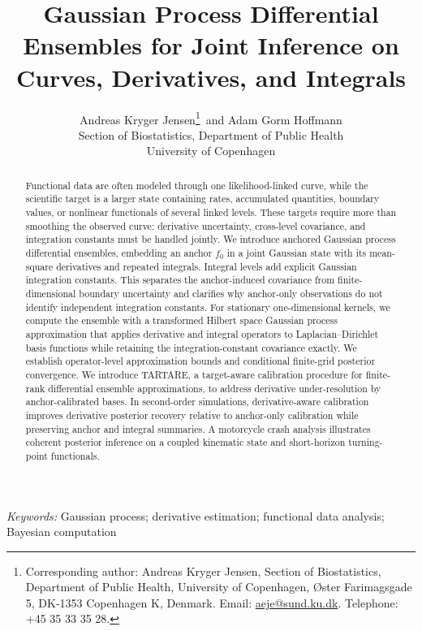\documentclass[11pt,a4paper]{article}
\title{Gaussian Process Differential Ensembles for Joint Inference on Curves, Derivatives, and Integrals}
\author{
  Andreas Kryger Jensen\thanks{Corresponding author: Andreas Kryger Jensen, Section of Biostatistics, Department of Public Health, University of Copenhagen, {\O}ster Farimagsgade 5, DK-1353 Copenhagen K, Denmark. Email: \href{mailto:aeje@sund.ku.dk}{aeje@sund.ku.dk}. Telephone: +45 35 33 35 28.}\, and Adam Gorm Hoffmann\\
  Section of Biostatistics, Department of Public Health\\
  University of Copenhagen}
\date{}
\theoremstyle{definition}
\theoremstyle{remark}
\begin{document}
\onehalfspacing

\maketitle




\begin{abstract}
Functional data are often modeled through one likelihood-linked curve, while the scientific target is a larger state containing rates, accumulated quantities, boundary values, or nonlinear functionals of several linked levels. These targets require more than smoothing the observed curve: derivative uncertainty, cross-level covariance, and integration constants must be handled jointly. We introduce anchored Gaussian process differential ensembles, embedding an anchor \(f_0\) in a joint Gaussian state with its mean-square derivatives and repeated integrals. Integral levels add explicit Gaussian integration constants. This separates the anchor-induced covariance from finite-dimensional boundary uncertainty and clarifies why anchor-only observations do not identify independent integration constants. For stationary one-dimensional kernels, we compute the ensemble with a transformed Hilbert space Gaussian process approximation that applies derivative and integral operators to Laplacian--Dirichlet basis functions while retaining the integration-constant covariance exactly. We establish operator-level approximation bounds and conditional finite-grid posterior convergence. We introduce TARTARE, a target-aware calibration procedure for finite-rank differential ensemble approximations, to address derivative under-resolution by anchor-calibrated bases. In second-order simulations, derivative-aware calibration improves derivative posterior recovery relative to anchor-only calibration while preserving anchor and integral summaries. A motorcycle crash analysis illustrates coherent posterior inference on a coupled kinematic state and short-horizon turning-point functionals.
\end{abstract}

\noindent%
{\it Keywords:} Gaussian process; derivative estimation; functional data analysis; Bayesian computation
\end{document}
